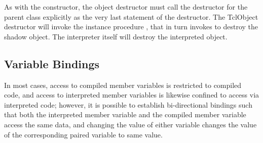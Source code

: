 As with the constructor, the object destructor must call the destructor
for the parent class explicitly as the very last statement of the destructor.
The TclObject destructor
will invoke the instance procedure ,
that in turn invokes 
to destroy the shadow object.
The interpreter itself will destroy the interpreted object.

\subsection{Variable Bindings}
\label{sec:VarBinds}

In most cases,
access to compiled member variables is restricted to compiled code,
and access to interpreted member variables is likewise
confined to access via interpreted code;
however, it is possible to establish bi-directional bindings
such that both the interpreted member variable
and the compiled member variable access the same data, 
and changing the value of either variable
changes the value of the corresponding paired variable to same value.

